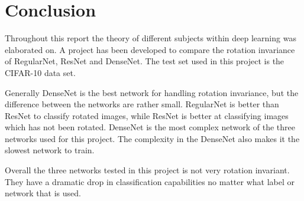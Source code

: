 \chapter{Conclusion}
\label{chp:conc}

Throughout this report the theory of different subjects within deep learning was elaborated on. A project has been developed to compare the rotation invariance of RegularNet, ResNet and DenseNet. The test set used in this project is the CIFAR-10 data set.

Generally DenseNet is the best network for handling rotation invariance, but the difference between the networks are rather small. RegularNet is better than ResNet to classify rotated images, while ResNet is better at classifying images which has not been rotated. DenseNet is the most complex network of the three networks used for this project. The complexity in the DenseNet also makes it the slowest network to train.
\newline

Overall the three networks tested in this project is not very rotation invariant. They have a dramatic drop in classification capabilities no matter what label or network that is used.